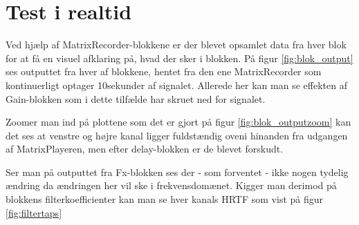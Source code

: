 \section{Test i realtid}

Ved hjælp af MatrixRecorder-blokkene er der blevet opsamlet data fra hver blok for at få en visuel afklaring på, hvad der sker i blokken. På figur \ref{fig:blok_output} ses outputtet fra hver af blokkene, hentet fra den ene MatrixRecorder som kontinuerligt optager 10sekunder af signalet. Allerede her kan man se effekten af Gain-blokken som i dette tilfælde har skruet ned for signalet.


Zoomer man ind på plottene som det er gjort på figur \ref{fig:blok_outputzoom} kan det ses at venstre og højre kanal ligger fuldstændig oveni hinanden fra udgangen af MatrixPlayeren, men efter delay-blokken er de blevet forskudt. 


Ser man på outputtet fra Fx-blokken ses der - som forventet - ikke nogen tydelig ændring da ændringen her vil ske i frekvensdomænet. Kigger man derimod på blokkens filterkoefficienter kan man se hver kanals HRTF som vist på figur \ref{fig:filtertaps}

